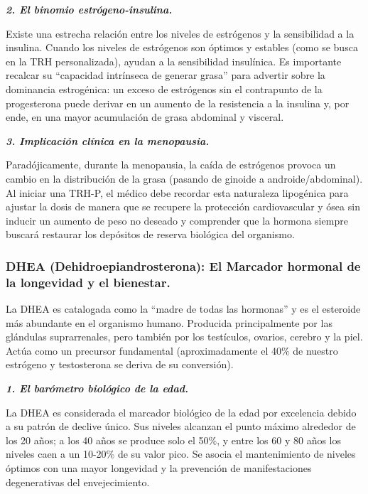 \documentclass[
  spanish,
]{article}
\begin{document}
\textbf{\emph{2. El binomio estrógeno-insulina.}}

Existe una estrecha relación entre los niveles de estrógenos y la sensibilidad a la insulina. Cuando los niveles de estrógenos son óptimos y estables (como se busca en la TRH personalizada), ayudan a la sensibilidad insulínica. Es importante recalcar su ``capacidad intrínseca de generar grasa'' para advertir sobre la dominancia estrogénica: un exceso de estrógenos sin el contrapunto de la progesterona puede derivar en un aumento de la resistencia a la insulina y, por ende, en una mayor acumulación de grasa abdominal y visceral.

\textbf{\emph{3. Implicación clínica en la menopausia.}}

Paradójicamente, durante la menopausia, la caída de estrógenos provoca un cambio en la distribución de la grasa (pasando de ginoide a androide/abdominal). Al iniciar una TRH-P, el médico debe recordar esta naturaleza lipogénica para ajustar la dosis de manera que se recupere la protección cardiovascular y ósea sin inducir un aumento de peso no deseado y comprender que la hormona siempre buscará restaurar los depósitos de reserva biológica del organismo.

\subsubsection{DHEA (Dehidroepiandrosterona): El Marcador hormonal de la longevidad y el bienestar.}\label{dhea-dehidroepiandrosterona-el-marcador-hormonal-de-la-longevidad-y-el-bienestar.}

La DHEA es catalogada como la ``madre de todas las hormonas'' y es el esteroide más abundante en el organismo humano. Producida principalmente por las glándulas suprarrenales, pero también por los testículos, ovarios, cerebro y la piel. Actúa como un precursor fundamental (aproximadamente el 40\% de nuestro estrógeno y testosterona se deriva de su conversión).

\textbf{\emph{1. El barómetro biológico de la edad.}}

La DHEA es considerada el marcador biológico de la edad por excelencia debido a su patrón de declive único. Sus niveles alcanzan el punto máximo alrededor de los 20 años; a los 40 años se produce solo el 50\%, y entre los 60 y 80 años los niveles caen a un 10-20\% de su valor pico. Se asocia el mantenimiento de niveles óptimos con una mayor longevidad y la prevención de manifestaciones degenerativas del envejecimiento.
\end{document}
